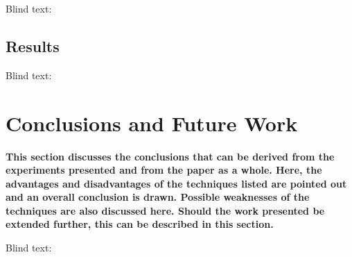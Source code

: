 Blind text:

\lipsum[1]

\subsection{Results}
\label{subsec:results}

Blind text:

\lipsum[1]


\section{Conclusions and Future Work}
\label{sec:discussion_conclusion}

\textbf{This section discusses the conclusions that can be derived from the
experiments presented and from the paper as a whole. Here, the advantages and
disadvantages of the techniques listed are pointed out and an overall conclusion
is drawn. Possible weaknesses of the techniques are also discussed here. Should
the work presented be extended further, this can be described in this section.}

Blind text:

\lipsum[1-2]
